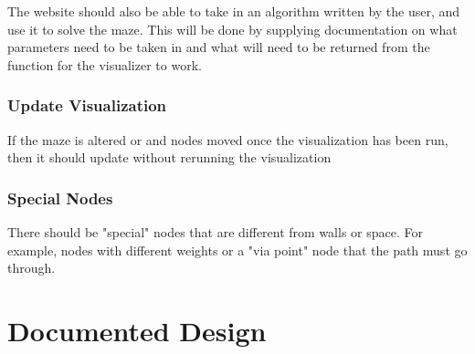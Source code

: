 \documentclass{article}
\begin{document}
The website should also be able to take in an algorithm written by the user, and use it to solve the maze. This will be done by supplying documentation on what parameters need to be taken in and what will need to be returned from the function for the visualizer to work.
\subsubsection{Update Visualization}
If the maze is altered or and nodes moved once the visualization has been run, then it should update without rerunning the visualization

\subsubsection{Special Nodes}
There should be "special" nodes that are different from walls or space. For example, nodes with different weights or a "via point" node that the path must go through.
\section{Documented Design}
\end{document}
